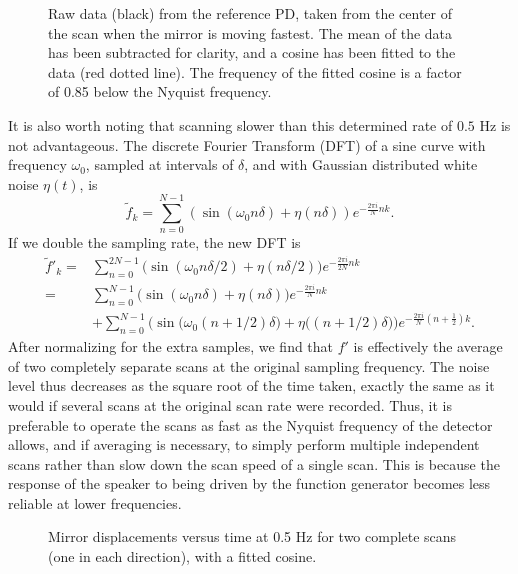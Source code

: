 \documentclass[12pt]{report}
\begin{document}
\begin{figure}[t]
  \centering
  \iftoggle{imgs}{
    \texttt{[image: RawRefSignal]}
  }{}
  \caption{Raw data (black) from the reference PD, taken from the center of the scan when the mirror is moving fastest. The mean of the data has been subtracted for clarity, and a cosine has been fitted to the data (red dotted line). The frequency of the fitted cosine is a factor of 0.85 below the Nyquist frequency.}
  \label{fig:reference}
\end{figure}

It is also worth noting that scanning slower than this determined rate of $0.5$ Hz is not advantageous. The discrete Fourier Transform (DFT) of a sine curve with frequency $\omega_{0}$, sampled at intervals of $\delta$, and with Gaussian distributed white noise $\eta(t)$, is 
\begin{equation}\label{eq:10}
\tilde f_{k} = \sum_{n=0}^{N-1}\left(\sin (\omega_{0}n\delta) +\eta(n\delta)\right)e^{-\frac{2\pi i}{N}nk}. 
\end{equation}
If we double the sampling rate, the new DFT is 
\begin{align}
  \tilde f'_{k}
  =& \sum_{n=0}^{2N-1}\Big(\sin(\omega_{0}n\delta/2) + \eta(n\delta/2)\Big)e^{-\frac{2\pi i}{2N}nk}\nonumber \\
  =& \sum_{n=0}^{N-1}\Big(\sin(\omega_{0}n\delta)+\eta(n\delta)\Big)e^{-\frac{2\pi i}{N}nk}\nonumber \\
  &+ \sum_{n=0}^{N-1}\Big(\sin\big(\omega_{0}(n+1/2)\delta\big) + \eta\big((n + 1/2)\delta\big) \Big)e^{-\frac{2\pi i}{N}(n+\frac{1}{2})k}.
  \label{eq:11}
\end{align}
After normalizing for the extra samples, we find that $f'$ is effectively the average of two completely separate scans at the original sampling frequency. The noise level thus decreases as the square root of the time taken, exactly the same as it would if several scans at the original scan rate were recorded. Thus, it is preferable to operate the scans as fast as the Nyquist frequency of the detector allows, and if averaging is necessary, to simply perform multiple independent scans rather than slow down the scan speed of a single scan. This is because the response of the speaker to being driven by the function generator becomes less reliable at lower frequencies.

\begin{figure}
  \centering
  \iftoggle{imgs}{
    \texttt{[image: Speed]}
  }{}
  \caption{Mirror displacements versus time at 0.5 Hz for two complete scans (one in each direction), with a fitted cosine.}
  \label{fig:speed}
\end{figure}
\end{document}

